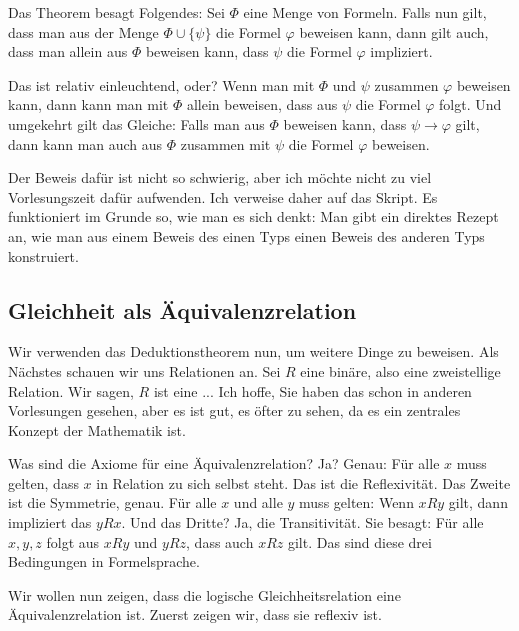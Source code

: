 \begin{spoken-clean}[00:48:37 - 00:51:37]
Das Theorem besagt Folgendes: Sei $\Phi$ eine Menge von Formeln. Falls nun gilt, dass man aus der Menge $\Phi \cup \{\psi\}$ die Formel $\varphi$ beweisen kann, dann gilt auch, dass man allein aus $\Phi$ beweisen kann, dass $\psi$ die Formel $\varphi$ impliziert.

Das ist relativ einleuchtend, oder? Wenn man mit $\Phi$ und $\psi$ zusammen $\varphi$ beweisen kann, dann kann man mit $\Phi$ allein beweisen, dass aus $\psi$ die Formel $\varphi$ folgt. Und umgekehrt gilt das Gleiche: Falls man aus $\Phi$ beweisen kann, dass $\psi \to \varphi$ gilt, dann kann man auch aus $\Phi$ zusammen mit $\psi$ die Formel $\varphi$ beweisen.

Der Beweis dafür ist nicht so schwierig, aber ich möchte nicht zu viel Vorlesungszeit dafür aufwenden. Ich verweise daher auf das Skript. Es funktioniert im Grunde so, wie man es sich denkt: Man gibt ein direktes Rezept an, wie man aus einem Beweis des einen Typs einen Beweis des anderen Typs konstruiert.
\end{spoken-clean}

\subsection{Gleichheit als Äquivalenzrelation}

\begin{spoken-clean}[00:51:37 - 00:54:25]
Wir verwenden das Deduktionstheorem nun, um weitere Dinge zu beweisen. Als Nächstes schauen wir uns Relationen an. Sei $R$ eine binäre, also eine zweistellige Relation. Wir sagen, $R$ ist eine ... Ich hoffe, Sie haben das schon in anderen Vorlesungen gesehen, aber es ist gut, es öfter zu sehen, da es ein zentrales Konzept der Mathematik ist.

Was sind die Axiome für eine Äquivalenzrelation? Ja? Genau: Für alle $x$ muss gelten, dass $x$ in Relation zu sich selbst steht. Das ist die Reflexivität. Das Zweite ist die Symmetrie, genau. Für alle $x$ und alle $y$ muss gelten: Wenn $x R y$ gilt, dann impliziert das $y R x$. Und das Dritte? Ja, die Transitivität. Sie besagt: Für alle $x, y, z$ folgt aus $x R y$ und $y R z$, dass auch $x R z$ gilt. Das sind diese drei Bedingungen in Formelsprache.

Wir wollen nun zeigen, dass die logische Gleichheitsrelation eine Äquivalenzrelation ist. Zuerst zeigen wir, dass sie reflexiv ist.
\end{spoken-clean}

